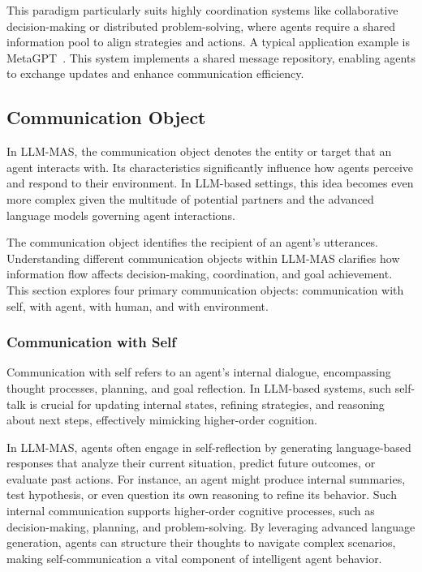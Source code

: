 This paradigm particularly suits highly coordination systems like collaborative decision-making or distributed problem-solving, where agents require a shared information pool to align strategies and actions. A typical application example is MetaGPT~\cite{metagpt}. This system implements a shared message repository, enabling agents to exchange updates and enhance communication efficiency. 

\subsection{Communication Object}
In LLM-MAS, the communication object denotes the entity or target that an agent interacts with. Its characteristics significantly influence how agents perceive and respond to their environment. In LLM-based settings, this idea becomes even more complex given the multitude of potential partners and the advanced language models governing agent interactions.

The communication object identifies the recipient of an agent's utterances. Understanding different communication objects within LLM-MAS clarifies how information flow affects decision-making, coordination, and goal achievement. This section explores four primary communication objects: communication with self, with agent, with human, and with environment.

\subsubsection{Communication with Self}
Communication with self refers to an agent's internal dialogue, encompassing thought processes, planning, and goal reflection. In LLM-based systems, such self-talk is crucial for updating internal states, refining strategies, and reasoning about next steps, effectively mimicking higher-order cognition.

In LLM-MAS, agents often engage in self-reflection by generating language-based responses that analyze their current situation, predict future outcomes, or evaluate past actions. For instance, an agent might produce internal summaries, test hypothesis, or even question its own reasoning to refine its behavior. Such internal communication supports higher-order cognitive processes, such as decision-making, planning, and problem-solving. By leveraging advanced language generation, agents can structure their thoughts to navigate complex scenarios, making self-communication a vital component of intelligent agent behavior.

